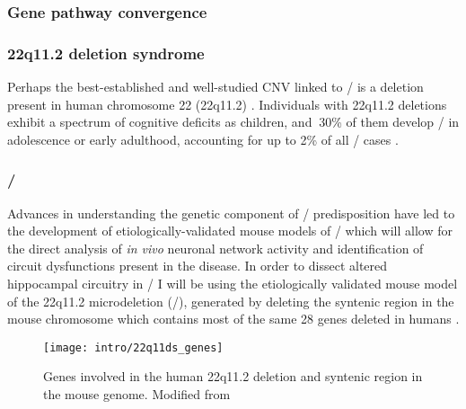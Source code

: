 \subsubsection{Gene pathway convergence}

\subsubsection{22q11.2 deletion syndrome}
Perhaps the best-established and well-studied CNV linked to \scz/ is a deletion present in human chromosome 22 (22q11.2) \citep{Karayiorgou1995, Chow2006, Karayiorgou2010}.
Individuals with 22q11.2 deletions exhibit a spectrum of cognitive deficits as children, and $~$30\% of them develop \scz/ in adolescence or early adulthood, accounting for up to 2\% of all \scz/ cases \citep{Karayiorgou2010}.

\subsubsection{\df/}
Advances in understanding the genetic component of \scz/ predisposition have led to the development of etiologically-validated mouse models of \scz/ which will allow for the direct analysis of \emph{in vivo} neuronal network activity and identification of circuit dysfunctions present in the disease.
In order to dissect altered hippocampal circuitry in \scz/ I will be using the etiologically validated mouse model of the 22q11.2 microdeletion (\df/), generated by deleting the syntenic region in the mouse chromosome which contains most of the same 28 genes deleted in humans \citep{Stark2008}.
\begin{figure}
	\centering
	\texttt{[image: intro/22q11ds\_genes]}
	\caption[Genetic deletion in 22q11.2DS and \df/]{Genes involved in the human 22q11.2 deletion and syntenic region in the mouse genome. Modified from \citet{Karayiorgou2010}}
	\label{fig:intro:scz:22q11_genes}
\end{figure}

